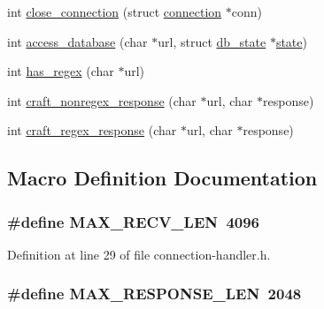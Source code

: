 \begin{DoxyCompactItemize}
int \hyperlink{connection-handler_8h_a0171242e91a6a1c18938b8aba84625e5}{close\-\_\-connection} (struct \hyperlink{structconnection}{connection} $\ast$conn)
\item 
int \hyperlink{connection-handler_8h_a371095605bf8a8222590bc46b2d38b59}{access\-\_\-database} (char $\ast$url, struct \hyperlink{structdb__state}{db\-\_\-state} $\ast$\hyperlink{http__parser_8c_adc6e5733fc3c22f0a7b2914188c49c90}{state})
\item 
int \hyperlink{connection-handler_8h_aad4e23d034482bdd8a28174ff70d3ea0}{has\-\_\-regex} (char $\ast$url)
\item 
int \hyperlink{connection-handler_8h_a40ddee505082e691c9e94a8afda7d4b5}{craft\-\_\-nonregex\-\_\-response} (char $\ast$url, char $\ast$response)
\item 
int \hyperlink{connection-handler_8h_a7cb78a1a29fdde2658e016d01287bf7a}{craft\-\_\-regex\-\_\-response} (char $\ast$url, char $\ast$response)
\end{DoxyCompactItemize}


\subsection{Macro Definition Documentation}
\hypertarget{connection-handler_8h_a774d5c0d74bbc47fad33f175a0bd13f4}{
\subsubsection[{M\-A\-X\-\_\-\-R\-E\-C\-V\-\_\-\-L\-E\-N}]{\setlength{\rightskip}{0pt plus 5cm}\#define M\-A\-X\-\_\-\-R\-E\-C\-V\-\_\-\-L\-E\-N~4096}}\label{connection-handler_8h_a774d5c0d74bbc47fad33f175a0bd13f4}


Definition at line 29 of file connection-\/handler.\-h.

\hypertarget{connection-handler_8h_a9a83ff2f12aca569bc0f799a56e7a2c2}{
\subsubsection[{M\-A\-X\-\_\-\-R\-E\-S\-P\-O\-N\-S\-E\-\_\-\-L\-E\-N}]{\setlength{\rightskip}{0pt plus 5cm}\#define M\-A\-X\-\_\-\-R\-E\-S\-P\-O\-N\-S\-E\-\_\-\-L\-E\-N~2048}}\label{connection-handler_8h_a9a83ff2f12aca569bc0f799a56e7a2c2}



